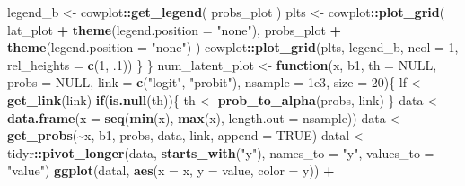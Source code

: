 \documentclass[
  man,floatsintext]{apa6}
\newenvironment{Shaded}{\begin{snugshade}}{\end{snugshade}}
\newcommand{\AttributeTok}[1]{\textcolor[rgb]{0.13,0.29,0.53}{#1}}
\newcommand{\ConstantTok}[1]{\textcolor[rgb]{0.56,0.35,0.01}{#1}}
\newcommand{\ControlFlowTok}[1]{\textcolor[rgb]{0.13,0.29,0.53}{\textbf{#1}}}
\newcommand{\DecValTok}[1]{\textcolor[rgb]{0.00,0.00,0.81}{#1}}
\newcommand{\FloatTok}[1]{\textcolor[rgb]{0.00,0.00,0.81}{#1}}
\newcommand{\FunctionTok}[1]{\textcolor[rgb]{0.13,0.29,0.53}{\textbf{#1}}}
\newcommand{\NormalTok}[1]{#1}
\newcommand{\OtherTok}[1]{\textcolor[rgb]{0.56,0.35,0.01}{#1}}
\newcommand{\SpecialCharTok}[1]{\textcolor[rgb]{0.81,0.36,0.00}{\textbf{#1}}}
\newcommand{\StringTok}[1]{\textcolor[rgb]{0.31,0.60,0.02}{#1}}
\begin{document}
\begin{Shaded}
\begin{Highlighting}[]
\NormalTok{    legend\_b }\OtherTok{\textless{}{-}}\NormalTok{ cowplot}\SpecialCharTok{::}\FunctionTok{get\_legend}\NormalTok{(}
\NormalTok{      probs\_plot}
\NormalTok{    )}
\NormalTok{    plts }\OtherTok{\textless{}{-}}\NormalTok{ cowplot}\SpecialCharTok{::}\FunctionTok{plot\_grid}\NormalTok{(}
\NormalTok{      lat\_plot }\SpecialCharTok{+} \FunctionTok{theme}\NormalTok{(}\AttributeTok{legend.position =} \StringTok{"none"}\NormalTok{),}
\NormalTok{      probs\_plot }\SpecialCharTok{+} \FunctionTok{theme}\NormalTok{(}\AttributeTok{legend.position =} \StringTok{"none"}\NormalTok{)}
\NormalTok{    )}
\NormalTok{    cowplot}\SpecialCharTok{::}\FunctionTok{plot\_grid}\NormalTok{(plts, legend\_b, }\AttributeTok{ncol =} \DecValTok{1}\NormalTok{, }\AttributeTok{rel\_heights =} \FunctionTok{c}\NormalTok{(}\DecValTok{1}\NormalTok{, .}\DecValTok{1}\NormalTok{))}
\NormalTok{  \}}
\NormalTok{\}}
\NormalTok{num\_latent\_plot }\OtherTok{\textless{}{-}} \ControlFlowTok{function}\NormalTok{(x, }
\NormalTok{                            b1, }
                            \AttributeTok{th =} \ConstantTok{NULL}\NormalTok{, }
                            \AttributeTok{probs =} \ConstantTok{NULL}\NormalTok{,}
                            \AttributeTok{link =} \FunctionTok{c}\NormalTok{(}\StringTok{"logit"}\NormalTok{, }\StringTok{"probit"}\NormalTok{), }
                            \AttributeTok{nsample =} \FloatTok{1e3}\NormalTok{, }
                            \AttributeTok{size =} \DecValTok{20}\NormalTok{)\{}
\NormalTok{  lf }\OtherTok{\textless{}{-}} \FunctionTok{get\_link}\NormalTok{(link)}
  \ControlFlowTok{if}\NormalTok{(}\FunctionTok{is.null}\NormalTok{(th))\{}
\NormalTok{    th }\OtherTok{\textless{}{-}} \FunctionTok{prob\_to\_alpha}\NormalTok{(probs, link)}
\NormalTok{  \}}
\NormalTok{  data }\OtherTok{\textless{}{-}} \FunctionTok{data.frame}\NormalTok{(}\AttributeTok{x =} \FunctionTok{seq}\NormalTok{(}\FunctionTok{min}\NormalTok{(x), }\FunctionTok{max}\NormalTok{(x), }\AttributeTok{length.out =}\NormalTok{ nsample))}
\NormalTok{  data }\OtherTok{\textless{}{-}} \FunctionTok{get\_probs}\NormalTok{(}\SpecialCharTok{\textasciitilde{}}\NormalTok{x, b1, probs, data, link, }\AttributeTok{append =} \ConstantTok{TRUE}\NormalTok{)}
\NormalTok{  datal }\OtherTok{\textless{}{-}}\NormalTok{ tidyr}\SpecialCharTok{::}\FunctionTok{pivot\_longer}\NormalTok{(data, }\FunctionTok{starts\_with}\NormalTok{(}\StringTok{"y"}\NormalTok{), }\AttributeTok{names\_to =} \StringTok{"y"}\NormalTok{, }\AttributeTok{values\_to =} \StringTok{"value"}\NormalTok{)}
  \FunctionTok{ggplot}\NormalTok{(datal, }\FunctionTok{aes}\NormalTok{(}\AttributeTok{x =}\NormalTok{ x, }\AttributeTok{y =}\NormalTok{ value, }\AttributeTok{color =}\NormalTok{ y)) }\SpecialCharTok{+}

\end{Highlighting}
\end{Shaded}
\end{document}
